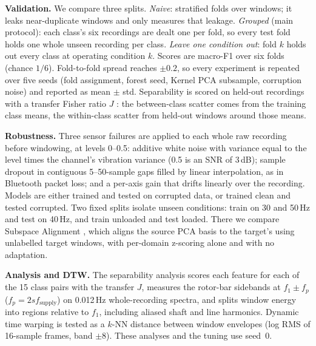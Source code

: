 \textbf{Validation.} We compare three splits. \emph{Naive}: stratified folds over windows; it
leaks near-duplicate windows and only measures that leakage. \emph{Grouped} (main protocol):
each class's six recordings are dealt one per fold, so every test fold holds one whole unseen
recording per class. \emph{Leave one condition out}: fold $k$ holds out every class at operating
condition $k$. Scores are macro-F1 over six folds (chance $1/6$). Fold-to-fold spread reaches
$\pm0.2$, so every experiment is repeated over five seeds (fold assignment, forest seed, Kernel
PCA subsample, corruption noise) and reported as mean $\pm$ std. Separability is scored on
held-out recordings with a transfer Fisher ratio $J$ \cite{fisher1936, duda2001}: the between-class scatter comes from the
training class means, the within-class scatter from held-out windows around those means.

\textbf{Robustness.} Three sensor failures are applied to each whole raw recording before
windowing, at levels 0--0.5: additive white noise with variance equal to the level times the
channel's vibration variance (0.5 is an SNR of 3\,dB); sample dropout in contiguous 5--50-sample
gaps filled by linear interpolation, as in Bluetooth packet loss; and a per-axis gain that
drifts linearly over the recording. Models are either trained and tested on corrupted data, or
trained clean and tested corrupted. Two fixed splits
isolate unseen conditions: train on 30 and 50\,Hz and test on 40\,Hz, and train unloaded and test
loaded. There we compare Subspace Alignment \cite{fernando2013}, which aligns the source PCA
basis to the target's using unlabelled target windows, with per-domain z-scoring alone and with
no adaptation.

\textbf{Analysis and DTW.} The separability analysis scores each feature for each of the 15
class pairs with the transfer $J$, measures the rotor-bar sidebands at $f_1 \pm f_p$
($f_p = 2sf_\mathrm{supply}$) on 0.012\,Hz whole-recording spectra, and splits window energy into
regions relative to $f_1$, including aliased shaft and line harmonics. Dynamic time warping
\cite{sakoe1978} is tested as a $k$-NN distance between window envelopes (log RMS of 16-sample
frames, band $\pm 8$). These analyses and the tuning use seed~0.
